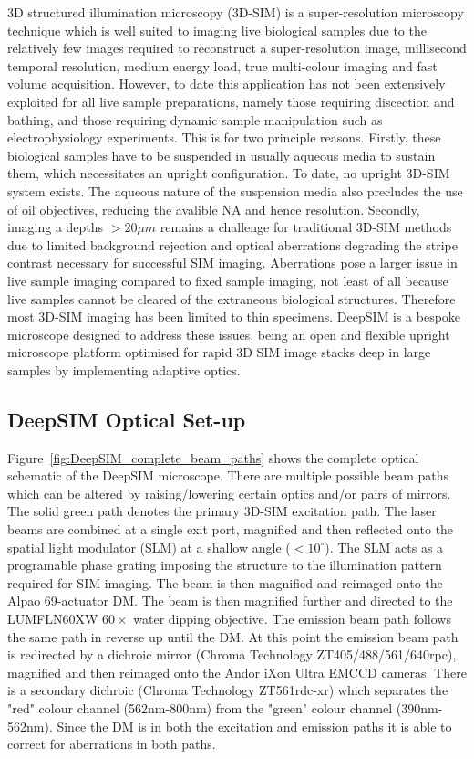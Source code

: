 3D structured illumination microscopy (3D-SIM) is a super-resolution microscopy technique which is well suited to imaging live biological samples due to the relatively few images required to reconstruct a super-resolution image, millisecond temporal resolution, medium energy load, true multi-colour imaging and fast volume acquisition.\cite{schermelleh2010guide,schermelleh2019super} 
However, to date this application has not been extensively exploited for all live sample preparations, namely those requiring discection and bathing, and those requiring dynamic sample manipulation such as electrophysiology experiments. This is for two principle reasons. Firstly, these biological samples have to be suspended in usually aqueous  media to sustain them, which necessitates an upright configuration. To date, no upright 3D-SIM system exists. The aqueous nature of the suspension media also precludes the use of oil objectives, reducing the avalible NA and hence resolution. Secondly, imaging a depths $>20\mu m$ remains a challenge for traditional 3D-SIM methods due to limited background rejection and optical aberrations degrading the stripe contrast necessary for successful SIM imaging.\cite{wu2018faster} Aberrations pose a larger issue in live sample imaging compared to fixed sample imaging, not least of all because live samples cannot be cleared of the extraneous biological structures. Therefore most 3D-SIM imaging has been limited to thin specimens. DeepSIM is a bespoke microscope designed to address these issues, being an open and flexible upright microscope platform optimised for rapid 3D SIM image stacks deep in large samples by implementing adaptive optics. 

\subsection{DeepSIM Optical Set-up}
\label{subsec:DeepSIM_optics}

Figure~\ref{fig:DeepSIM_complete_beam_paths} shows the complete optical schematic of the DeepSIM microscope. There are multiple possible beam paths which can be altered by raising/lowering certain optics and/or pairs of mirrors. The solid green path denotes the primary 3D-SIM excitation path. The laser beams are combined at a single exit port, magnified and then reflected onto the spatial light modulator (SLM) at a shallow angle ($<10^{\circ}$). The SLM acts as a programable phase grating imposing the structure to the illumination pattern required for SIM imaging. The beam is then magnified and reimaged onto the Alpao 69-actuator DM. The beam is then magnified further and directed to the LUMFLN60XW $60\times$ water dipping objective. The emission beam path follows the same path in reverse up until the DM. At this point the emission beam path is redirected by a dichroic mirror (Chroma Technology ZT405/488/561/640rpc), magnified and then reimaged onto the Andor iXon Ultra EMCCD cameras. There is a secondary dichroic (Chroma Technology ZT561rdc-xr) which separates the "red" colour channel (562nm-800nm) from the "green" colour channel (390nm-562nm). Since the DM is in both the excitation and emission paths it is able to correct for aberrations in both paths.

